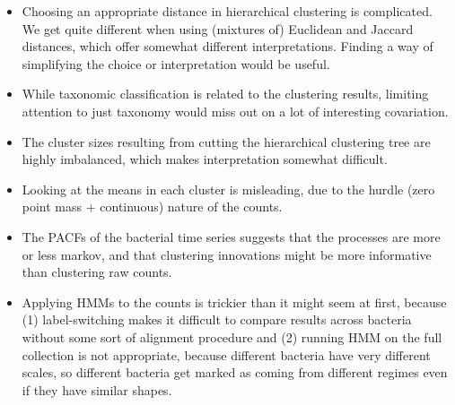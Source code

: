 \documentclass{article}
\begin{document}
\begin{itemize}
\item Choosing an appropriate distance in hierarchical clustering is
  complicated. We get quite different when using (mixtures of) Euclidean and
  Jaccard distances, which offer somewhat different interpretations. Finding a
  way of simplifying the choice or interpretation would be useful.
\item While taxonomic classification is related to the clustering results,
  limiting attention to just taxonomy would miss out on a lot of interesting
  covariation.
\item The cluster sizes resulting from cutting the hierarchical clustering tree
  are highly imbalanced, which makes interpretation somewhat difficult.
\item Looking at the means in each cluster is misleading, due to the hurdle
  (zero point mass + continuous) nature of the counts.
\item The PACFs of the bacterial time series suggests that the processes are
  more or less markov, and that clustering innovations might be more informative
  than clustering raw counts.
\item Applying HMMs to the counts is trickier than it might seem at first,
  because (1) label-switching makes it difficult to compare results across
  bacteria without some sort of alignment procedure and (2) running HMM on the
  full collection is not appropriate, because different bacteria have very
  different scales, so different bacteria get marked as coming from different
  regimes even if they have similar shapes.
\end{itemize}



\end{document}

